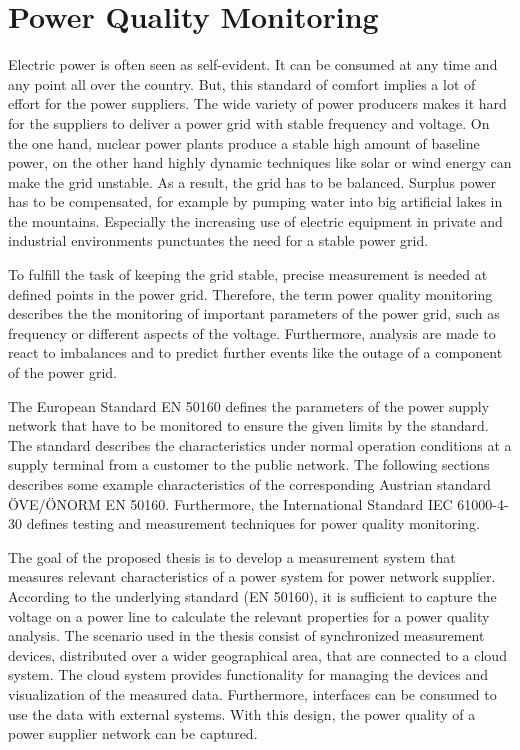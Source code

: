\section{Power Quality Monitoring}
Electric power is often seen as self-evident. It can be consumed at any time and any point all over the country. But, this standard of comfort implies a lot of effort for the power suppliers. The wide variety of power producers makes it hard for the suppliers to deliver a power grid with stable frequency and voltage. On the one hand, nuclear power plants produce a stable high amount of baseline power, on the other hand highly dynamic techniques like solar or wind energy can make the grid unstable.
As a result, the grid has to be balanced. Surplus power has to be compensated, for example by pumping water into big artificial lakes in the mountains. Especially the increasing use of electric equipment in private and industrial environments punctuates the need for a stable power grid.

To fulfill the task of keeping the grid stable, precise measurement is needed at defined points in the power grid. Therefore, the term power quality monitoring describes the the monitoring of important parameters of the power grid, such as frequency or different aspects of the voltage. Furthermore, analysis are made to react to imbalances and to predict further events like the outage of a component of the power grid.


The European Standard EN 50160 defines the parameters of the power supply network that have to be monitored to ensure the given limits by the standard. The standard describes the characteristics under normal operation conditions at a supply terminal from a customer to the public network. The following sections describes some example characteristics of the corresponding Austrian standard \"OVE/\"ONORM EN 50160\cite{en50160}. Furthermore, the International Standard IEC 61000-4-30 defines testing and measurement techniques for power quality monitoring. \cite{iec61000}


The goal of the proposed thesis is to develop a measurement system that measures relevant characteristics of a power system for power network supplier. According to the underlying standard (EN 50160), it is sufficient to capture the voltage on a power line to calculate the relevant properties for a power quality analysis. The scenario used in the thesis consist of synchronized measurement devices, distributed over a wider geographical area, that are connected to a cloud system. The cloud system provides functionality for managing the devices and visualization of the measured data. Furthermore, interfaces can be consumed to use the data with external systems. With this design, the power quality of a power supplier network can be captured.

